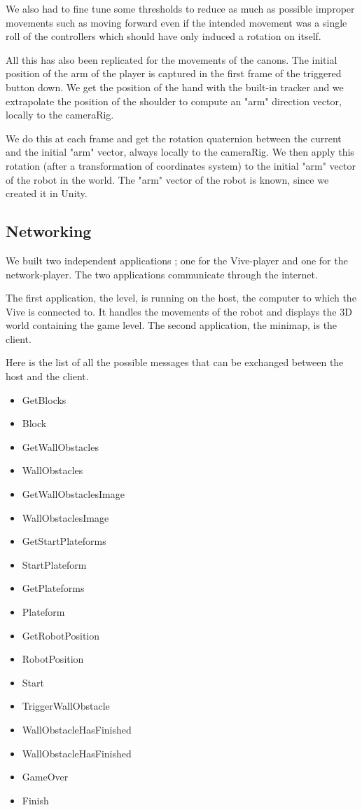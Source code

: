 \documentclass[12pt]{article}
\begin{document}
We also had to fine tune some thresholds to reduce as much as possible improper movements such as moving forward even if the intended movement was a single roll of the controllers which should have only induced a rotation on itself.

All this has also been replicated for the movements of the canons. The initial position of the arm of the player is captured in the first frame of the triggered button down. We get the position of the hand with the built-in tracker and we extrapolate the position of the shoulder to compute an "arm" direction vector, locally to the cameraRig.

 We do this at each frame and get the rotation quaternion between the current and the initial "arm" vector, always locally to the cameraRig. We then apply this rotation (after a transformation of coordinates system) to the initial "arm" vector of the robot in the world. The "arm" vector of the robot is known, since we created it in Unity.

\subsection{Networking}

We built two independent applications ; one for the Vive-player and one for the network-player. The two applications communicate through the internet.

The first application, the level, is running on the host, the computer to which the Vive is connected to. It handles the movements of the robot and displays the 3D world containing the game level. The second application, the minimap, is the client.

Here is the list of all the possible messages that can be exchanged between the host and the client.

\begin{itemize}  
\item GetBlocks 
\item Block
\item GetWallObstacles 
\item WallObstacles
\item GetWallObstaclesImage 
\item WallObstaclesImage
\item GetStartPlateforms 
\item StartPlateform
\item GetPlateforms 
\item Plateform
\item GetRobotPosition
\item RobotPosition
\item Start
\item TriggerWallObstacle
\item WallObstacleHasFinished
\item WallObstacleHasFinished
\item GameOver
\item Finish
\end{itemize}
\end{document}
